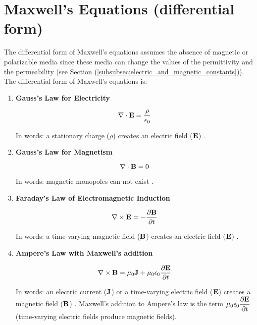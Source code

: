\documentclass{article}
\theoremstyle{definition}
\begin{document}
\bigskip
\section{Maxwell's Equations (differential form)}
\label{sec:maxwells_equations_differential_form}
The differential form of Maxwell's equations assumes the absence
of magnetic or polarizable media since these media can change the
values of the permittivity and the permeability (see Section
(\ref{subsubsec:electric_and_magnetic_constants})). The differential
form of Maxwell's equations is:

\bigskip
\begin{enumerate}
\item {\bf Gauss's Law for Electricity}
\label{item:gauss_law_electricity}

\begin{equation*}
\nabla \cdot \mathbf{E} = \dfrac{\rho}{\epsilon_0} 	
\end{equation*}

\bigskip
\noindent
In words: a stationary charge ($\rho$) creates an electric 
field ($\mathbf{E}$) \cite{gauss_law_for_electricity}.


\bigskip
\item {\bf Gauss's Law for Magnetism}
\label{item:gauss_law_magnetism}

\begin{equation*}
\nabla \cdot \mathbf{B} = 0							
\end{equation*}

\bigskip
\noindent
In words: magnetic monopoles can not 
exist \cite{gauss_law_for_magnetic_fields}.


\bigskip
\item {\bf Faraday's Law of Electromagnetic Induction} 
\label{item:faradays_law_of_induction}

\begin{equation*}
\nabla \times \mathbf{E} = -\dfrac{\partial \mathbf{B}}{\partial t}
\end{equation*}

\bigskip
\noindent
In words: a time-varying magnetic field ($\mathbf{B}$) creates 
an electric field ($\mathbf{E}$) \cite{faradays_law}.


\bigskip
\item  {\bf Ampere's Law with Maxwell's addition}
\label{item:ampers_law}

\begin{equation*}
\nabla \times \mathbf{B} = \mu_0 \mathbf{J} + \mu_0 \epsilon_0 
\dfrac{\partial \mathbf{E}}{\partial t}					
\end{equation*}

\bigskip
{
\noindent
In words: an electric current ($\mathbf{J}$) or a time-varying 
electric field ($\mathbf{E}$) creates a magnetic field ($\mathbf{B}$) \cite{amperes_law}. 
Maxwell's addition to Ampere's law is the term $\mu_0 \epsilon_0 \dfrac{\partial 
\mathbf{E}} {\partial t}$ (time-varying electric fields produce magnetic
fields).	
\par}
\end{enumerate}
\end{document}
